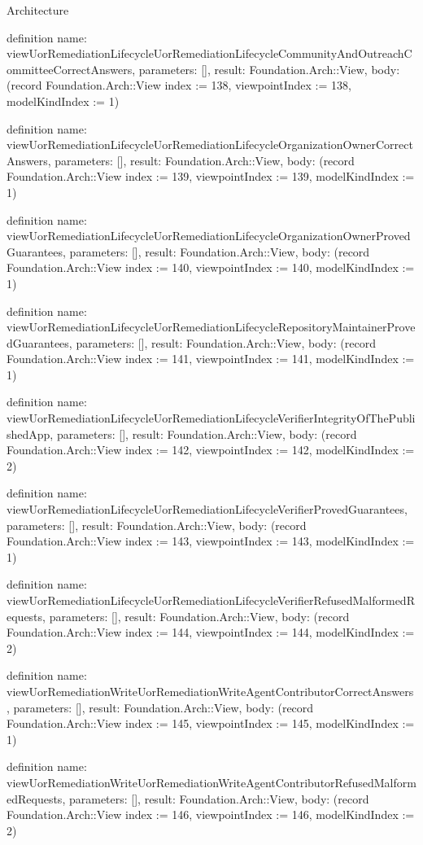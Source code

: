 \begin{lexlean}{Architecture}
\begin{semanticmodule}
definition{
  name: viewUorRemediationLifecycleUorRemediationLifecycleCommunityAndOutreachCommitteeCorrectAnswers,
  parameters: [],
  result: Foundation.Arch::View,
  body: (record Foundation.Arch::View {index := 138, viewpointIndex := 138, modelKindIndex := 1})
}

definition{
  name: viewUorRemediationLifecycleUorRemediationLifecycleOrganizationOwnerCorrectAnswers,
  parameters: [],
  result: Foundation.Arch::View,
  body: (record Foundation.Arch::View {index := 139, viewpointIndex := 139, modelKindIndex := 1})
}

definition{
  name: viewUorRemediationLifecycleUorRemediationLifecycleOrganizationOwnerProvedGuarantees,
  parameters: [],
  result: Foundation.Arch::View,
  body: (record Foundation.Arch::View {index := 140, viewpointIndex := 140, modelKindIndex := 1})
}

definition{
  name: viewUorRemediationLifecycleUorRemediationLifecycleRepositoryMaintainerProvedGuarantees,
  parameters: [],
  result: Foundation.Arch::View,
  body: (record Foundation.Arch::View {index := 141, viewpointIndex := 141, modelKindIndex := 1})
}

definition{
  name: viewUorRemediationLifecycleUorRemediationLifecycleVerifierIntegrityOfThePublishedApp,
  parameters: [],
  result: Foundation.Arch::View,
  body: (record Foundation.Arch::View {index := 142, viewpointIndex := 142, modelKindIndex := 2})
}

definition{
  name: viewUorRemediationLifecycleUorRemediationLifecycleVerifierProvedGuarantees,
  parameters: [],
  result: Foundation.Arch::View,
  body: (record Foundation.Arch::View {index := 143, viewpointIndex := 143, modelKindIndex := 1})
}

definition{
  name: viewUorRemediationLifecycleUorRemediationLifecycleVerifierRefusedMalformedRequests,
  parameters: [],
  result: Foundation.Arch::View,
  body: (record Foundation.Arch::View {index := 144, viewpointIndex := 144, modelKindIndex := 2})
}

definition{
  name: viewUorRemediationWriteUorRemediationWriteAgentContributorCorrectAnswers,
  parameters: [],
  result: Foundation.Arch::View,
  body: (record Foundation.Arch::View {index := 145, viewpointIndex := 145, modelKindIndex := 1})
}

definition{
  name: viewUorRemediationWriteUorRemediationWriteAgentContributorRefusedMalformedRequests,
  parameters: [],
  result: Foundation.Arch::View,
  body: (record Foundation.Arch::View {index := 146, viewpointIndex := 146, modelKindIndex := 2})
}


\end{semanticmodule}
\end{lexlean}
